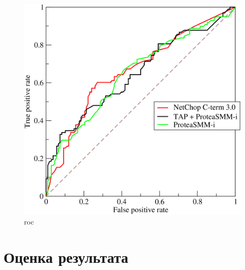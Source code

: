 \documentclass[11pt]{article}
\makeatletter
\def\maxwidth{\ifdim\Gin@nat@width>\linewidth\linewidth
    \else\Gin@nat@width\fi}
\let\Oldincludegraphics\includegraphics
\renewcommand{\includegraphics}[1]{\Oldincludegraphics[width=.8\maxwidth]{#1}}
\makeatother
\begin{document}
\begin{figure}
\centering
\includegraphics{images/roc_curves.png}
\caption{roc}
\end{figure}

    \hypertarget{ux43eux446ux435ux43dux43aux430-ux440ux435ux437ux443ux43bux44cux442ux430ux442ux430}{%
\section{Оценка
результата}\label{ux43eux446ux435ux43dux43aux430-ux440ux435ux437ux443ux43bux44cux442ux430ux442ux430}}
\end{document}
